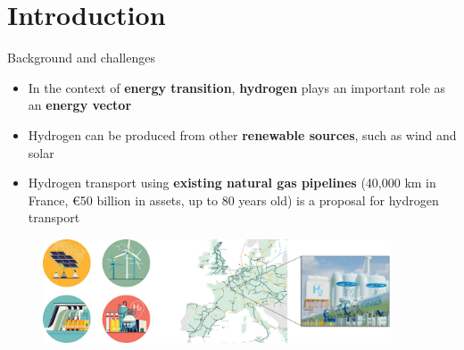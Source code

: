 \documentclass[9pt]{beamer}
\author[Daniella LOPES PINTO]{Daniella LOPES PINTO \textsuperscript{1,2*} \\ 
\texttt{\textcolor{black}{daniella.lopes\_pinto@minesparis.psl.eu}}}
\subtitle{\LARGE Finite element models for the study of hydrogen embrittlement of steel structures}
\institute
{\textbf{Academic advisor}: Jacques BESSON \textsuperscript{1} \\
\vspace{0.25cm}
\textbf{Industrial advisor}: Nikolay OSIPOV \textsuperscript{2} \\
\vspace{0.4cm}
{\textsuperscript{1} Centre des Matériaux, Mines Paris} \\
\vspace{0.15cm}
\textsuperscript{2} Transvalor S.A. \\
\vspace{0.2cm}
\center{\textbf{Thesis defense} \\ \small March 7\textsuperscript{th} 2025} 
\center{\textcolor{white}{XXXXXXXX}}}
\begin{document}
\begin{frame}[plain]
    \maketitle
\end{frame}

\section{Introduction}


\begin{frame}{Background and challenges}

    \begin{itemize}
		\item In the context of \textbf{energy transition}, \textbf{hydrogen} plays an important role as an \textbf{energy vector}
		\vspace{0.15cm}
		\item Hydrogen can be produced from other \textbf{renewable sources}, such as wind and solar
		\vspace{0.15cm}
		\item Hydrogen transport using \textbf{existing natural gas pipelines} (40,000 km in France, €50 billion in assets, up to 80 years old) is a proposal for hydrogen transport
    \end{itemize}
    
    \vspace{0.2cm}

\begin{figure}
	\centering
	\includegraphics[width=0.92\textwidth]{Images/Context.pdf}
\end{figure}
    
\end{frame}

\end{document}
